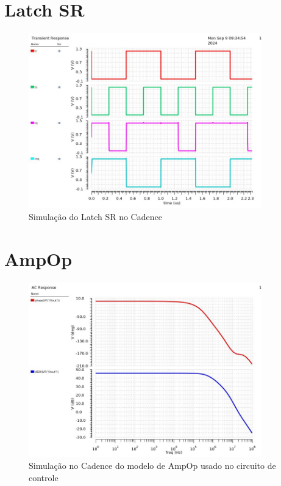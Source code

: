 \section{Latch SR}

\begin{figure}[htb]
	\centering
	\includegraphics[width=0.9\textwidth]{figuras/imgs_jv/sim_lach.jpg}
	\caption{Simulação do Latch SR no Cadence }
	\label{fig17}
\end{figure}


\section{AmpOp}

\begin{figure}[htb]
	\centering
	\includegraphics[width=0.9\textwidth]{figuras/imgs_jv/sim_ampop.jpg}
	\caption{ Simulação no Cadence do modelo de AmpOp usado no circuito de controle }
	\label{fig18}
\end{figure}





